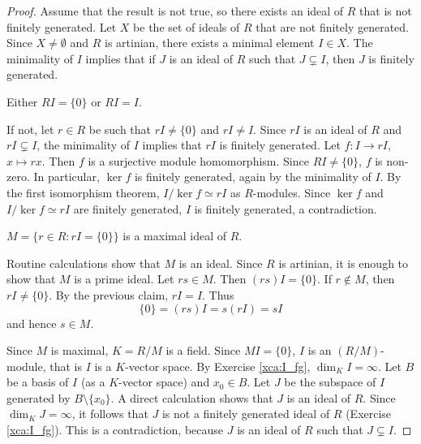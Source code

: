 \begin{proof}
    Assume that the result is not true, so there exists an ideal of $R$ 
    that is not finitely generated. 
    Let $X$ be the set of ideals of $R$ that are not finitely generated. 
    Since $X\ne\emptyset$ and $R$ is artinian, there exists a minimal 
    element $I\in X$. The minimality of $I$ implies that 
    if $J$ is an ideal of $R$ such that $J\subsetneq I$, then 
    $J$ is finitely generated. 

    \begin{claim}
        Either $RI=\{0\}$ or $RI=I$.
    \end{claim}
    
    If not, let $r\in R$ be such that $rI\ne\{0\}$ and $rI\ne I$. 
    Since $rI$ is an ideal of $R$ and
    $rI\subsetneq I$, the minimality of $I$ implies that 
    $rI$ is finitely generated. Let 
    $f\colon I\to rI$, $x\mapsto rx$. Then $f$ is a 
    surjective module homomorphism. Since $RI\ne\{0\}$, 
    $f$ is non-zero. In particular, $\ker f$ 
    is finitely generated, again by the minimality of $I$. 
    By the first isomorphism theorem, $I/\ker f\simeq rI$ as $R$-modules.
    Since $\ker f$ and $I/\ker f\simeq rI$ are finitely generated, 
    $I$ is finitely generated, a contradiction.
    
    \begin{claim}
        $M=\{r\in R:rI=\{0\}\}$ is a maximal ideal of $R$. 
    \end{claim}
    
    Routine calculations show that $M$ is an ideal. Since 
    $R$ is artinian, it is enough to show that $M$ is a prime ideal. 
    Let $rs\in M$. Then $(rs)I=\{0\}$. If $r\not\in M$, 
    then $rI\ne\{0\}$. By the previous claim, $rI=I$. Thus
    \[
    \{0\}=(rs)I=s(rI)=sI
    \]
    and hence $s\in M$.     
    
    \medskip
    Since $M$ is maximal, $K=R/M$ is a field. 
    Since $MI=\{0\}$, $I$ is an $(R/M)$-module, that is 
    $I$ is a $K$-vector space. By Exercise \ref{xca:I_fg}, 
    $\dim_KI=\infty$. Let $B$ be a basis of $I$ (as a $K$-vector space) 
    and $x_0\in B$. Let $J$ be the subspace of $I$ generated by
    $B\setminus\{x_0\}$. A direct calculation
    shows that 
    $J$ is an ideal of $R$.
    Since $\dim_K J=\infty$, it follows that $J$ 
    is not a finitely generated ideal of $R$ 
    (Exercise \ref{xca:I_fg}). 
    This is a contradiction, because $J$ is an ideal of $R$
    such that $J\subsetneq I$. 
\end{proof}
